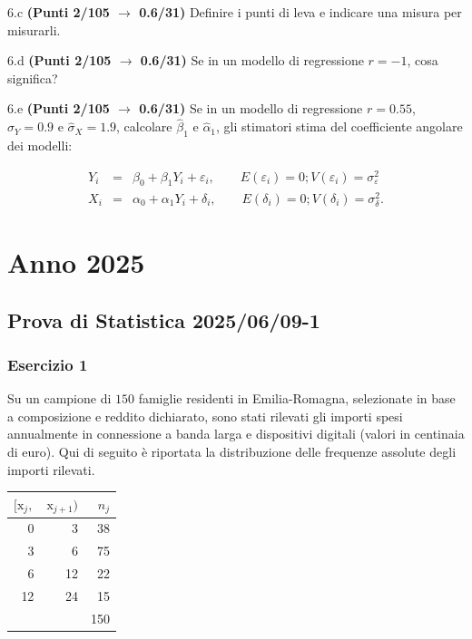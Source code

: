 \documentclass[
  11pt,
]{book}
\theoremstyle{mytheoremstyle}
\theoremstyle{mydefstyle}
\begin{document}
6.c \textbf{(Punti 2/105 \(\rightarrow\) 0.6/31)} Definire i punti di leva e indicare una misura per misurarli.

6.d \textbf{(Punti 2/105 \(\rightarrow\) 0.6/31)} Se in un modello di regressione \(r=-1\), cosa significa?

6.e \textbf{(Punti 2/105 \(\rightarrow\) 0.6/31)} Se in un modello di regressione \(r=0.55\), \(\hat\sigma_Y=0.9\) e \(\hat\sigma_X=1.9\), calcolare \(\hat\beta_1\) e
\(\hat\alpha_1\), gli stimatori stima del coefficiente angolare dei modelli:

\begin{eqnarray*}
Y_i &=& \beta_0+\beta_1 Y_i + \varepsilon_i, \qquad E(\varepsilon_i)=0; V(\varepsilon_i)=\sigma_\varepsilon^2\\
X_i &=& \alpha_0+\alpha_1 Y_i + \delta_i, \qquad E(\delta_i)=0; V(\delta_i)=\sigma_\delta^2.
\end{eqnarray*}

\chapter{Anno 2025}\label{anno-2025}

\section{Prova di Statistica 2025/06/09-1}\label{prova-di-statistica-20250609-1}

\subsection{Esercizio 1}\label{esercizio-1-43}

Su un campione di \(150\) famiglie residenti in Emilia-Romagna, selezionate in base a composizione e reddito dichiarato, sono stati rilevati gli importi spesi annualmente in connessione a banda larga e dispositivi digitali (valori in centinaia di euro). Qui di seguito è riportata la distribuzione delle frequenze assolute degli importi rilevati.

\begin{table}[H]
\centering
\begin{tabular}{rrr}
\toprule
$[\text{x}_j,$ & $\text{x}_{j+1})$ & $n_j$\\
\midrule
0 & 3 & 38\\
3 & 6 & 75\\
6 & 12 & 22\\
12 & 24 & 15\\
 &  & 150\\
\bottomrule
\end{tabular}
\end{table}
\end{document}
